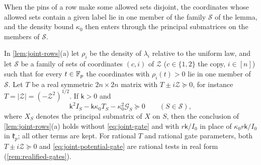When the pins of a row make some allowed sets disjoint, the coordinates whose allowed
sets contain a given label lie in one member of the family $\mathcal S$ of
the lemma, and the density bound $\kappa_0$ then enters through the
principal submatrices on the members of $\mathcal S$.

\begin{lemma}\label{lem:joint-potential}
In \cref{lem:joint-rows}(a) let $\rho_i$ be the density of $\lambda_i$ relative to the
uniform law, and let $\mathcal S$ be a family of sets of coordinates $(c,i)$ of
$\mathcal Z$ ($c\in\{1,2\}$ the copy, $i\in[n]$) such that for every $t\in\mathbb F_p$ the
coordinates with $\rho_i(t)>0$ lie in one member of $\mathcal S$. Let $T$ be a real
symmetric $2n\times2n$ matrix with $T\pm i\mathcal Z\succeq0$, for instance
$T=|\mathcal Z|=(-\mathcal Z^2)^{1/2}$. If $\mathsf k>0$ and
\begin{equation}\label{eq:joint-potential-gate}
 \mathsf k^2I_S-\mathsf k\kappa_0T_S-\kappa_0^2\mathcal G_S\succeq0\qquad(S\in\mathcal S),
\end{equation}
where $X_S$ denotes the principal submatrix of $X$ on $S$, then the conclusion of
\cref{lem:joint-rows}(a) holds without \eqref{eq:joint-gate} and with $r\mathsf k/I_0$
in place of $\kappa_0r\mathsf k/I_0$ in $\mathfrak k_p$; all other terms are kept.
For rational $T$ and rational gate parameters, both
$T\pm i\mathcal Z\succeq0$ and \eqref{eq:joint-potential-gate} are rational tests in real
form (\cref{rem:realified-gates}).
\end{lemma}

